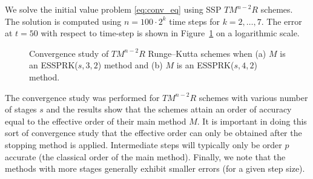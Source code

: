 We solve the initial value problem \eqref{eq:conv_eq}
using SSP $TM^{n-2}R$ schemes.
The solution is computed using $n = 100 \cdot 2^{k}$ time steps for
$k = 2, \dots, 7$.
The error at $t = 50$ with respect to time-step is shown in 
Figure~\ref{fig:conv_study} on a logarithmic scale.
\begin{figure}
	\centering
   \quad
    \caption{Convergence study of $TM^{n-2}R$ Runge--Kutta schemes when (a) $M$
    is an ESSPRK($s,3,2$) method and (b) $ M $ is an ESSPRK($s,4,2$) method.}
    \label{fig:conv_study}
\end{figure}
The convergence study was performed for $TM^{n-2}R$ schemes with
various number of stages $s$ and the results show that the schemes
attain an order of accuracy equal to the effective order of their main
method $M$.
It is important in doing this sort of convergence study that the
effective order can only be obtained after the stopping method is
applied.
Intermediate steps will typically only be order $p$ accurate (the classical
order of the main method).
Finally, we note that the methods with more stages generally exhibit smaller errors
(for a given step size).

